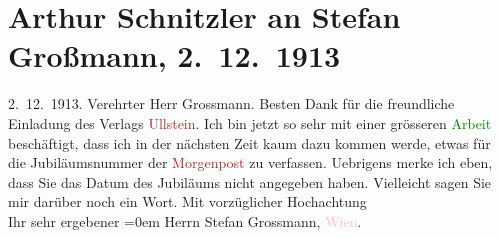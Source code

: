 

               \section[Arthur Schnitzler an Stefan Großmann, 2. 12. 1913]{ Arthur Schnitzler an Stefan Großmann, 2. 12. 1913}\nopagebreak{}\rehead{ }\normalsize\beginnumbering{} \toendnotes[C]{\smallbreak\pagebreak[2]} 
\toendnotes[C]{\smallbreak}\pstart
           \raggedleft{}{\pb}2. 12. 1913.\pend
           \pstart\center{}Verehrter Herr Grossmann.\pend\pstart
           Besten Dank für die freundliche Einladung des Verlags \textcolor{brown}{Ullstein}{}\ledrightnote{\textcolor{brown}{Ullstein Verlag}}. Ich bin jetzt so sehr mit einer grösseren \textcolor{green}{Arbeit}{} beschäftigt, dass
                    ich in der nächsten Zeit kaum dazu kommen werde, etwas für die Jubiläumsnummer
                    der \textcolor{brown}{Morgenpost}{}\ledrightnote{\textcolor{brown}{Morgenpost}} zu verfassen. Uebrigens merke
                    ich eben, dass Sie das Datum des Jubiläums nicht angegeben haben. Vielleicht
                    sagen Sie mir darüber noch ein Wort.\pend
           \pstart
           Mit vorzüglicher Hochachtung{\\[\baselineskip]}Ihr sehr ergebener\pend
           \leftskip=0em{}{\bigskip}\pstart
           \noindent{}Herrn Stefan Grossmann, \textcolor{pink}{Wien}{}\ledrightnote{\textcolor{pink}{Wien}}.\pend
           \endnumbering{}  
      